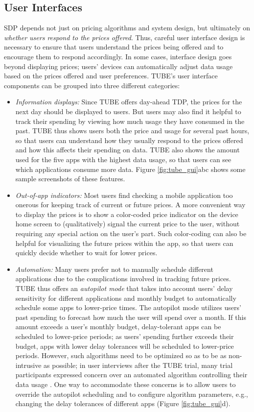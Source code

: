 \subsection{User Interfaces}

SDP depends not just on pricing algorithms and system design, but ultimately on \emph{whether users respond to the prices offered}. Thus, careful user interface design is necessary to ensure that users understand the prices being offered and to encourage them to respond accordingly. In some cases, interface design goes beyond displaying prices; users' devices can automatically adjust data usage based on the prices offered and user preferences. TUBE's user interface components can be grouped into three different categories:
\begin{itemize}
\item
\emph{Information displays:} Since TUBE offers day-ahead TDP, the prices for the next day should be displayed to users. But users may also find it helpful to track their spending by viewing how much usage they have consumed in the past. TUBE thus shows users both the price and usage for several past hours, so that users can understand how they usually respond to the prices offered and how this affects their spending on data. TUBE also shows the amount used for the five apps with the highest data usage, so that users can see which applications consume more data. Figure \ref{fig:tube_gui}abc shows some sample screenshots of these features. 
\item
\emph{Out-of-app indicators:} Most users find checking a mobile application too onerous for keeping track of current or future prices. A more convenient way to display the prices is to show a color-coded price indicator on the device home screen to (qualitatively) signal the current price to the user, without requiring any special action on the user's part. Such color-coding can also be helpful for visualizing the future prices within the app, so that users can quickly decide whether to wait for lower prices.
\item
\emph{Automation:} Many users prefer not to manually schedule different applications due to the complications involved in tracking future prices. TUBE thus offers an \emph{autopilot mode} that takes into account users' delay sensitivity for different applications and monthly budget to automatically schedule some apps to lower-price times. The autopilot mode utilizes users' past spending to forecast how much the user will spend over a month. If this amount exceeds a user's monthly budget, delay-tolerant apps can be scheduled to lower-price periods; as users' spending further exceeds their budget, apps with lower delay tolerances will be scheduled to lower-price periods. However, such algorithms need to be optimized so as to be as non-intrusive as possible; in user interviews after the TUBE trial, many trial participants expressed concern over an automated algorithm controlling their data usage \cite{sigchi}. One way to accommodate these concerns is to allow users to override the autopilot scheduling and to configure algorithm parameters, e.g., changing the delay tolerances of different apps (Figure \ref{fig:tube_gui}d).
\end{itemize}
